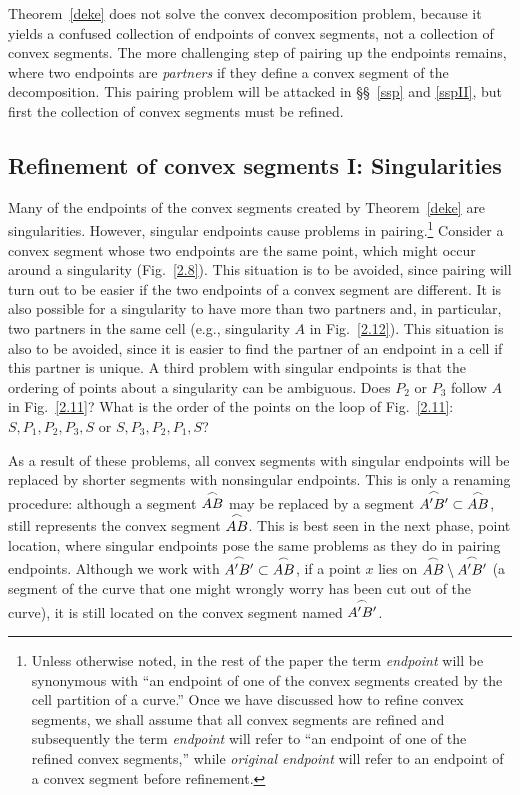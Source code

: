 Theorem~\ref{deke} does not solve the convex decomposition problem,
because it yields a confused collection of endpoints of convex segments, 
not a collection of convex segments.
The more challenging step of pairing up the endpoints remains, where
two endpoints are {\em partners} if they define a convex segment of the 
decomposition.
This pairing problem will be attacked in \S\S~\ref{ssp} 
and \ref{sspII}, but first the collection of convex segments must be 
refined.

\subsection{Refinement of convex segments I: Singularities}
\label{sec-refine1}

Many of the endpoints of the convex segments created by Theorem~\ref{deke} 
are singularities.  However, singular endpoints
cause problems in pairing.\footnote{Unless otherwise noted, in the rest of 
the paper
	the term {\em endpoint} will be synonymous with 
	``an endpoint of one of 
	the convex segments created by the cell partition of a curve.''
	Once we have discussed how to refine convex segments, we shall
	assume that all convex segments are refined and subsequently
	the term {\em endpoint} will refer to 
	``an endpoint of one of the refined convex segments,'' while
	{\em original endpoint} will refer to
	an endpoint of a convex segment before refinement.}
Consider a convex segment whose two endpoints are the same point,
which might occur around a singularity (Fig.~\ref{2.8}).
This situation is to be avoided, since pairing will turn out to be easier 
if 
the two endpoints of a convex segment are different.
It is also possible for a singularity to have more than two
partners and, in particular, two partners in the same cell (e.g., 
singularity 
$A$ in Fig.~\ref{2.12}).
This situation is also to be avoided, since it is easier to find the 
partner 
of an endpoint in a cell if this partner is unique.
A third problem with singular endpoints is that the ordering of points about
a singularity can be ambiguous.
Does $P_{2}$ or $P_{3}$ follow $A$ in Fig.~\ref{2.11}?
What is the order of the points on the loop of Fig.~\ref{2.11}: 
$S, P_{1}, P_{2}, P_{3}, S$ or $S, P_{3}, P_{2}, P_{1}, S$?


As a result of these problems, all convex segments with singular endpoints 
will be replaced by shorter segments with nonsingular endpoints.
This is only a renaming procedure: although a segment $\mbox{$\stackrel{\frown}{AB}$}$ may be 
replaced
by a segment $\mbox{$\stackrel{\frown}{A'B'}$} \subset \mbox{$\stackrel{\frown}{AB}$}$,
 still represents the convex segment $\mbox{$\stackrel{\frown}{AB}$}$.
This is best seen in the next phase, point location,
where singular endpoints pose the same problems as they
do in pairing endpoints.
Although we work with $\mbox{$\stackrel{\frown}{A'B'}$} \subset \mbox{$\stackrel{\frown}{AB}$}$, if a point $x$ lies 
on $\mbox{$\stackrel{\frown}{AB}$} \setminus \mbox{$\stackrel{\frown}{A'B'}$}$ (a segment of the curve that
one might wrongly worry has been cut out of the curve),
it is still located on the convex segment named $\mbox{$\stackrel{\frown}{A'B'}$}$.

